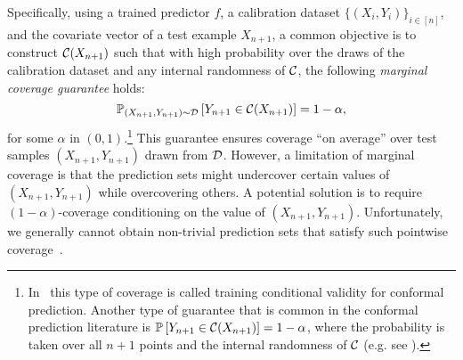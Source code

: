 Specifically, using a trained predictor $f$, a calibration dataset $\{(X_i, Y_i)\}_{i \in [n]}$, and the covariate vector of a test example $X_{n+1}$, a common objective is to construct ${\cal C}(X_{n+1})$ such that with high probability over the draws of the calibration dataset and any internal randomness of ${\cal C}$, the following \emph{marginal coverage guarantee} holds:
\begin{equation}
\label{eq:marginal_guarantee}
\mathbb P_{(X_{n+1},Y_{n+1}) \sim \cal D} \left[ Y_{n+1} \in {\cal C}(X_{n+1}) \right] = 1-\alpha,
\end{equation}
for some $\alpha$ in $(0,1)$.\footnote{ In~\citep{V12} this type of coverage is called training conditional validity for conformal prediction. Another type of guarantee that is common in the conformal prediction literature is $\mathbb {\mathbb{P}} \left[ Y_{n+1} \in {\cal C}(X_{n+1}) \right] = 1-\alpha$, where the probability is taken over all $n+1$ points and the internal randomness of ${\cal C}$ (e.g. see \citet{GCC2023}).}
This guarantee ensures coverage “on average” over test samples $(X_{n+1}, Y_{n+1})$ drawn from $\cal D$.
However, a limitation of marginal coverage is that the prediction sets might undercover certain values of $(X_{n+1}, Y_{n+1})$ while overcovering others. A potential solution is to require $(1-\alpha)$-coverage conditioning on the value of $(X_{n+1}, Y_{n+1})$. Unfortunately, we generally cannot obtain non-trivial prediction sets that satisfy such pointwise coverage~\citep{V12, LW14, BCRT21}.

